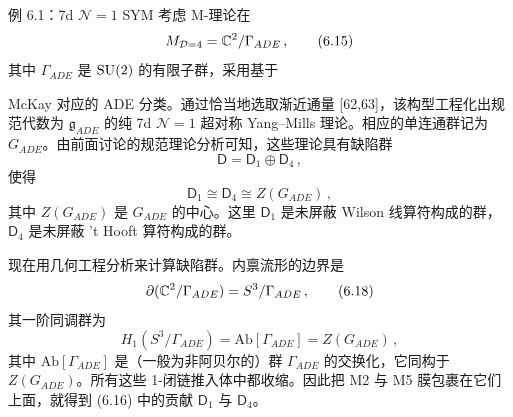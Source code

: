 \begin{examplebox}{例 6.1：7d $\mathcal{N}=1$ SYM}
考虑 M-理论在
\begin{equation}
  M_{\mathcal{D}=4} = \mathbb{C}^2/\Gamma_{ADE}\,, \tag{6.15}
\end{equation}
其中 $\Gamma_{ADE}$ 是 $\mathrm{SU}(2)$ 的有限子群，采用基于

McKay 对应的 ADE 分类。通过恰当地选取渐近通量 [62,63]，该构型工程化出规范代数为 $\mathfrak{g}_{ADE}$ 的纯 7d $\mathcal{N}=1$ 超对称 Yang--Mills 理论。相应的单连通群记为 $G_{ADE}$。由前面讨论的规范理论分析可知，这些理论具有缺陷群
\begin{equation}
  \mathsf{D} = \mathsf{D}_1 \oplus \mathsf{D}_4\,, \tag{6.16}
\end{equation}
使得
\begin{equation}
  \mathsf{D}_1 \cong \mathsf{D}_4 \cong Z(G_{ADE})\,, \tag{6.17}
\end{equation}
其中 $Z(G_{ADE})$ 是 $G_{ADE}$ 的中心。这里 $\mathsf{D}_1$ 是未屏蔽 Wilson 线算符构成的群，$\mathsf{D}_4$ 是未屏蔽 't Hooft 算符构成的群。

现在用几何工程分析来计算缺陷群。内禀流形的边界是
\begin{equation}
  \partial(\mathbb{C}^2/\Gamma_{ADE}) = S^3/\Gamma_{ADE}\,, \tag{6.18}
\end{equation}
其一阶同调群为
\begin{equation}
  H_1(S^3/\Gamma_{ADE}) = \mathrm{Ab}[\Gamma_{ADE}] = Z(G_{ADE})\,, \tag{6.19}
\end{equation}
其中 $\mathrm{Ab}[\Gamma_{ADE}]$ 是（一般为非阿贝尔的）群 $\Gamma_{ADE}$ 的交换化，它同构于 $Z(G_{ADE})$。所有这些 1-闭链推入体中都收缩。因此把 M2 与 M5 膜包裹在它们上面，就得到 (6.16) 中的贡献 $\mathsf{D}_1$ 与 $\mathsf{D}_4$。
\end{examplebox}


